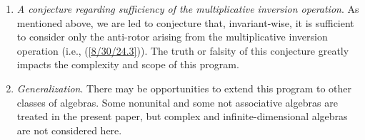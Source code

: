 \documentclass{amsart}
\numberwithin{equation}{section}
\theoremstyle{definition}
\numberwithin{theorem}{section}
\begin{document}
\begin{enumerate}
  \medskip
  
A combinatorial task of some interest in regard to how the set of algebras is structured, would be to find an expression for $f(n)$ (the number of distinct values of anti-rotor dimension that members of the set of $n$-dimensional algebras actually have) - or at least greatly improve on (b) above.   
There are evidently many similar combinatorial questions that can be proposed to additionally characterize the set of algebras, stemming from others of the anti-rotor based invariants (treated singly or jointly).
    
\item {\it A conjecture regarding sufficiency of the multiplicative inversion operation}.  As mentioned above, we are led to conjecture that, invariant-wise, it is sufficient to consider only the anti-rotor arising from the multiplicative inversion operation (i.e., (\ref{8/30/24.3})).  The truth or falsity of this conjecture greatly impacts the complexity and scope of this program. 
\item {\it Generalization}.  There may be opportunities to extend this program to other classes of algebras.  Some nonunital and some not associative algebras are treated in the present paper, but complex and infinite-dimensional algebras are not considered here.
\end{enumerate}

 
\end{document}
